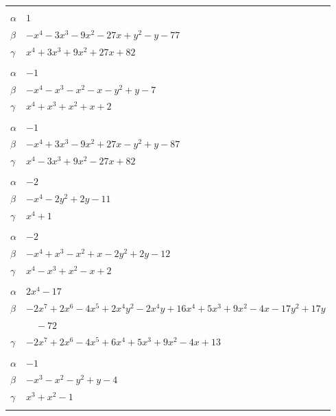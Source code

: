 \documentclass[11pt]{article}
\begin{document}
\begin{longtable}{@{}ll@{}}
\addlinespace[3pt]
\multicolumn{2}{@{}l}{$\{i,j\}=\{3,14\}$, $k_{ij}=2\cdot 11^{2}$}\\
$\alpha$ & $1$\\
$\beta$ & $-x^{4}-3x^{3}-9x^{2}-27x+y^{2}-y-77$\\
$\gamma$ & $x^{4}+3x^{3}+9x^{2}+27x+82$\\
\addlinespace[3pt]
\multicolumn{2}{@{}l}{$\{i,j\}=\{3,15\}$, $k_{ij}=2$}\\
$\alpha$ & $-1$\\
$\beta$ & $-x^{4}-x^{3}-x^{2}-x-y^{2}+y-7$\\
$\gamma$ & $x^{4}+x^{3}+x^{2}+x+2$\\
\addlinespace[3pt]
\multicolumn{2}{@{}l}{$\{i,j\}=\{3,16\}$, $k_{ij}=2\cdot 5^{3}$}\\
$\alpha$ & $-1$\\
$\beta$ & $-x^{4}+3x^{3}-9x^{2}+27x-y^{2}+y-87$\\
$\gamma$ & $x^{4}-3x^{3}+9x^{2}-27x+82$\\
\addlinespace[3pt]
\multicolumn{2}{@{}l}{$\{i,j\}=\{3,17\}$, $k_{ij}=2^{3}$}\\
$\alpha$ & $-2$\\
$\beta$ & $-x^{4}-2y^{2}+2y-11$\\
$\gamma$ & $x^{4}+1$\\
\addlinespace[3pt]
\multicolumn{2}{@{}l}{$\{i,j\}=\{3,18\}$, $k_{ij}=2^{2}\cdot 3$}\\
$\alpha$ & $-2$\\
$\beta$ & $-x^{4}+x^{3}-x^{2}+x-2y^{2}+2y-12$\\
$\gamma$ & $x^{4}-x^{3}+x^{2}-x+2$\\
\addlinespace[3pt]
\multicolumn{2}{@{}l}{$\{i,j\}=\{3,23\}$, $k_{ij}=5\cdot 11$}\\
$\alpha$ & $2x^{4}-17$\\
$\beta$ & $-2x^{7}+2x^{6}-4x^{5}+2x^{4}y^{2}-2x^{4}y+16x^{4}+5x^{3}+9x^{2}-4x-17y^{2}+17y$\\
 & $\quad -72$\\
$\gamma$ & $-2x^{7}+2x^{6}-4x^{5}+6x^{4}+5x^{3}+9x^{2}-4x+13$\\
\addlinespace[3pt]
\multicolumn{2}{@{}l}{$\{i,j\}=\{3,24\}$, $k_{ij}=3$}\\
$\alpha$ & $-1$\\
$\beta$ & $-x^{3}-x^{2}-y^{2}+y-4$\\
$\gamma$ & $x^{3}+x^{2}-1$\\
\addlinespace[3pt]
\multicolumn{2}{@{}l}{$\{i,j\}=\{3,26\}$, $k_{ij}=2\cdot 3\cdot 11$}\\

\end{longtable}
\end{document}
